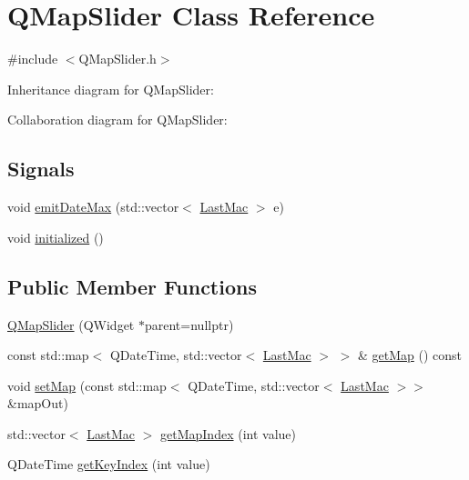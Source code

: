\hypertarget{class_q_map_slider}{}\section{Q\+Map\+Slider Class Reference}
\label{class_q_map_slider}


{\ttfamily \#include $<$Q\+Map\+Slider.\+h$>$}



Inheritance diagram for Q\+Map\+Slider\+:


Collaboration diagram for Q\+Map\+Slider\+:
\subsection*{Signals}
\begin{DoxyCompactItemize}
\item 
void \hyperlink{class_q_map_slider_a191888076af983a4048305d0587d9282}{emit\+Date\+Max} (std\+::vector$<$ \hyperlink{class_last_mac}{Last\+Mac} $>$ e)
\item 
void \hyperlink{class_q_map_slider_ab2150c989f271ea17b3201349b01cc84}{initialized} ()
\end{DoxyCompactItemize}
\subsection*{Public Member Functions}
\begin{DoxyCompactItemize}
\item 
\hyperlink{class_q_map_slider_aa6629ffbd73e5fc97e99480b977540e2}{Q\+Map\+Slider} (Q\+Widget $\ast$parent=nullptr)
\item 
const std\+::map$<$ Q\+Date\+Time, std\+::vector$<$ \hyperlink{class_last_mac}{Last\+Mac} $>$ $>$ \& \hyperlink{class_q_map_slider_adc1ca7acaab5a87f1d7c927aebcfdfdf}{get\+Map} () const
\item 
void \hyperlink{class_q_map_slider_a181f6dc64de17204033bb981b58d045f}{set\+Map} (const std\+::map$<$ Q\+Date\+Time, std\+::vector$<$ \hyperlink{class_last_mac}{Last\+Mac} $>$$>$ \&map\+Out)
\item 
std\+::vector$<$ \hyperlink{class_last_mac}{Last\+Mac} $>$ \hyperlink{class_q_map_slider_a348024031324d5067a5851e7a57777f9}{get\+Map\+Index} (int value)
\item 
Q\+Date\+Time \hyperlink{class_q_map_slider_a07fc790790cff4e5a7d5b5a5c7e4eb92}{get\+Key\+Index} (int value)
\end{DoxyCompactItemize}



